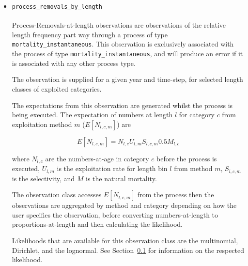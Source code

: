 \begin{itemize}
	\item \texttt{process\_removals\_by\_length}
	
	\paragraph*{\label{sec:removals-by-length}}\label{sec:Observation-ProcessRemovalsByLength}
	
	Process-Removals-at-length observations are observations of the relative length frequency part way through a process of type \texttt{mortality\_instantaneous}. This observation is exclusively associated with the process of type \texttt{mortality\_instantaneous}, and will produce an error if it is associated with any other process type.
	
	The observation is supplied for a given year and time-step, for selected length classes of exploited categories.

	The expectations from this observation are generated whilst the process is being executed. The expectation of numbers at length $l$ for category $c$ from exploitation method $m$ ($E[N_{l,c,m}]$) are
	
	\begin{equation}
	E[N_{l,c,m}] = N_{l,c} U_{l,m} S_{l,c,m} 0.5 M_{l,c}
	\end{equation}
	
	where $N_{l,c}$ are the numbers-at-age in category $c$ before the process is executed, $U_{l,m}$ is the exploitation rate for length bin $l$ from method $m$, $S_{l,c,m}$ is the selectivity, and $M$ is the natural mortality.
	
	The observation class accesses $E[N_{l,c,m}]$ from the process then the observations are aggregated by method and category depending on how the user specifies the observation, before converting numbers-at-length to proportions-at-length and then calculating the likelihood.
	
	Likelihoods that are available for this observation class are the multinomial, Dirichlet, and the lognormal. See Section~\ref{sec:Likelihood} for information on the respected likelihood.
\end{itemize}
\fi %

\subsection{}\label{sec:Likelihood}

